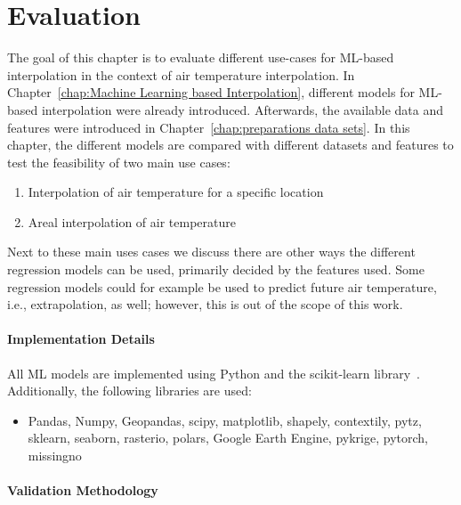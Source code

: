 \chapter{Evaluation}
\label{chap:Evaluation}

The goal of this chapter is to evaluate different use-cases for ML-based interpolation in the context of air temperature interpolation. In Chapter~\ref{chap:Machine Learning based Interpolation}, different models for ML-based interpolation were already introduced. Afterwards, the available data and features were introduced in Chapter~\ref{chap:preparations data sets}. In this chapter, the different models are compared with different datasets and features to test the feasibility of two main use cases:

\begin{enumerate}
  \item Interpolation of air temperature for a specific location
  \item Areal interpolation of air temperature
\end{enumerate}

Next to these main uses cases we discuss there are other ways the different regression models can be used, primarily decided by the features used. Some regression models could for example be used to predict future air temperature, i.e., extrapolation, as well; however, this is out of the scope of this work.

\subsubsection{Implementation Details}

All ML models are implemented using Python and the scikit-learn library~\cite{scikit-learn}. Additionally, the following libraries are used:

\begin{itemize}
  \item Pandas, Numpy, Geopandas, scipy, matplotlib, shapely, contextily, pytz, sklearn, seaborn, rasterio, polars, Google Earth Engine, pykrige, pytorch, missingno
\end{itemize}

\subsubsection{Validation Methodology}
\label{sec:validation methodology}


